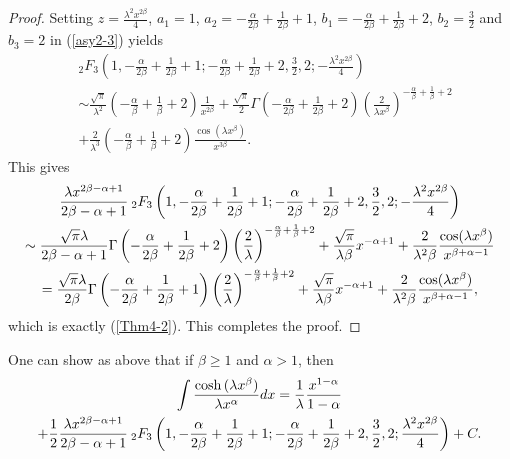 \documentclass[smallextended]{svjour3}
\begin{document}
\begin{proof}
Setting $z=\frac{\lambda^2 x^{2\beta}}{4}$, $a_1=1$, $a_2=-\frac{\alpha}{2\beta}+\frac{1}{2\beta}+1$,
$b_1=-\frac{\alpha}{2\beta}+\frac{1}{2\beta}+2$, $b_2=\frac{3}{2}$ and $b_3={2}$ in (\ref{asy2-3}) yields
\begin{align}
& _{2}F_{3}\left(1,-\frac{\alpha}{2\beta}+\frac{1}{2\beta}+1;-\frac{\alpha}{2\beta}+\frac{1}{2\beta}+2,\frac{3}{2},2;-\frac{\lambda^2 x^{2\beta}}{4}\right)\nonumber \\ &\sim \frac{\sqrt{\pi}}{\lambda^2}\left(-\frac{\alpha}{\beta}+\frac{1}{\beta}+{2}\right)\frac{1}{x^{2\beta}}
+\frac{\sqrt{\pi}}{2}\Gamma\left(-\frac{\alpha}{2\beta}+\frac{1}{2\beta}+2\right)\left(\frac{2}{\lambda x^{\beta}}\right)^{-\frac{\alpha}{\beta}+\frac{1}{\beta}+2}
\nonumber \\&+\frac{2}{\lambda^3}\left(-\frac{\alpha}{\beta}+\frac{1}{\beta}+{2}\right)\frac{\cos(\lambda x^{\beta})}{x^{3\beta}}.
\label{2F3-2}
\end{align}
This gives
\begin{multline}
\frac{\lambda x^{2\beta-\alpha+1}}{2\beta-\alpha+1}\hspace{.075cm} _{2}F_{3}\left(1,-\frac{\alpha}{2\beta}+\frac{1}{2\beta}+1;-\frac{\alpha}{2\beta}+\frac{1}{2\beta}+2,\frac{3}{2},2;-\frac{\lambda^2 x^{2\beta}}{4}\right)\\\sim
\frac{\sqrt{\pi}\lambda}{2\beta-\alpha+1}\Gamma\left(-\frac{\alpha}{2\beta}+\frac{1}{2\beta}+2\right)\left(\frac{2}{\lambda }\right)^{-\frac{\alpha}{\beta}+\frac{1}{\beta}+2}+\frac{\sqrt{\pi}}{\lambda\beta}x^{-\alpha+1}
+\frac{2}{\lambda^2\beta}\frac{\cos(\lambda x^{\beta})}{x^{\beta+\alpha-1}}\\
=\frac{\sqrt{\pi}\lambda}{2\beta}\Gamma\left(-\frac{\alpha}{2\beta}+\frac{1}{2\beta}+1\right)\left(\frac{2}{\lambda }\right)^{-\frac{\alpha}{\beta}+\frac{1}{\beta}+2}+\frac{\sqrt{\pi}}{\lambda\beta}x^{-\alpha+1}
+\frac{2}{\lambda^2\beta}\frac{\cos(\lambda x^{\beta})}{x^{\beta+\alpha-1}}\nonumber,
\end{multline}
which is exactly (\ref{Thm4-2}). This completes the proof.
\end{proof}

One can show as above that if $\beta\ge1$ and $\alpha>1$, then
\begin{multline}
\int\frac{\cosh{(\lambda x^\beta)}}{\lambda x^\alpha}dx=\frac{1}{\lambda}\frac{x^{1-\alpha}}{1-\alpha}\\+\frac{1}{2}\frac{\lambda x^{2\beta-\alpha+1}}{2\beta-\alpha+1}\hspace{.075cm} _{2}F_{3}\left(1,-\frac{\alpha}{2\beta}+\frac{1}{2\beta}+1;-\frac{\alpha}{2\beta}+\frac{1}{2\beta}+2,\frac{3}{2},2;\frac{\lambda^2 x^{2\beta}}{4}\right)+C.
\label{cosh}
\end{multline}
\end{document}
